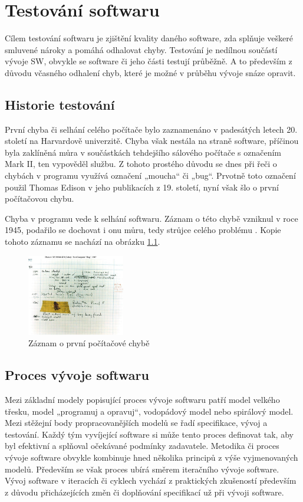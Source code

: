 \chapter{Testování softwaru}
Cílem testování softwaru je zjištění kvality daného software, zda splňuje veškeré smluvené nároky a pomáhá odhalovat chyby. Testování je nedílnou součástí vývoje SW, obvykle se software či jeho části testují průběžně. A to především z důvodu včasného odhalení chyb, které je možné v průběhu vývoje snáze opravit.

\section{Historie testování}
První chyba či selhání celého počítače bylo zaznamenáno v padesátých letech 20. století na Harvardově univerzitě. Chyba však nestála na straně software, příčinou byla zaklíněná můra v součástkách tehdejšího sálového počítače s označením Mark II, ten vypověděl službu. Z tohoto prostého důvodu se dnes při řeči o chybách v programu využívá označení „moucha“ či „bug“. Prvotně toto označení použil Thomas Edison v jeho publikacích z 19. století, nyní však šlo o první počítačovou chybu. 

Chyba v programu vede k selhání softwaru. Záznam o této chybě vzniknul v roce 1945, podařilo se dochovat i onu můru, tedy strůjce celého problému \cite{85SxcMZY6LKfV8v4}. Kopie tohoto záznamu se nachází na obrázku \ref{fig:zaznam-o-prvni-chybe}.


\begin{figure}[!h]
	\centering
	\includegraphics[width=0.38\textwidth]{Figures/first-pc-bug.jpg}
	\caption{Záznam o první počítačové chybě \cite{85SxcMZY6LKfV8v4}}
	\label{fig:zaznam-o-prvni-chybe}
\end{figure}

\section{Proces vývoje softwaru}
Mezi základní modely popisující proces vývoje softwaru patří model velkého třesku, model „programuj a opravuj“, vodopádový model nebo spirálový model. Mezi stěžejní body propracovanějších modelů se řadí specifikace, vývoj a testování. Každý tým vyvíjející software si může tento proces definovat tak, aby byl efektivní a splňoval očekávané podmínky zadavatele. Metodika či proces vývoje software obvykle kombinuje hned několika principů z výše vyjmenovaných modelů. Především se však proces ubírá směrem iteračního vývoje software. Vývoj software v iteracích či cyklech vychází z praktických zkušeností především z důvodu přicházejících změn či doplňování specifikací už při vývoji software.


